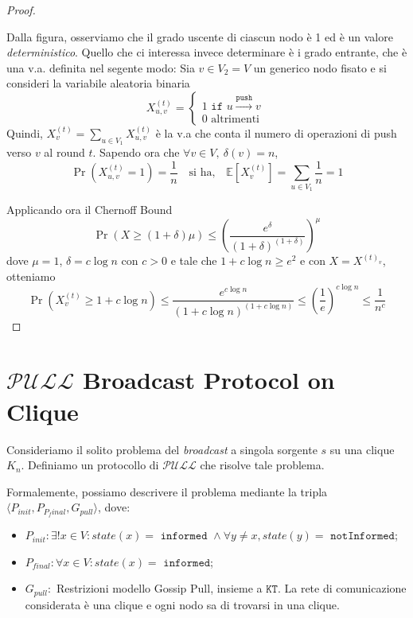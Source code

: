 \begin{lemma}
\begin{proof}
\begin{center}
\begin{tikzpicture}
            \end{tikzpicture}
        \end{center}
        Dalla figura, osserviamo che il grado uscente di ciascun nodo è 1 ed è un valore \textit{deterministico}. Quello che ci interessa invece determinare è i grado entrante, che è una v.a. definita nel segente modo: Sia $v \in V_2 = V$ un generico nodo fisato e si consideri la variabile aleatoria binaria
        \[
        X^{(t)}_{u,v} = 
            \begin{cases*}
            1 \texttt{ if } u \xrightarrow{\texttt{push}} v \\
            0 \text{ altrimenti }
            \end{cases*}
        \]
        Quindi, $X^{(t)}_v = \sum_{u \in V_1} X^{(t)}_{u,v}$ è la v.a che conta il numero di operazioni di push verso $v$ al round $t$. Sapendo ora che $\forall v \in V,\ \delta(v) = n$, 
        \[
            \Pr \left( X^{(t)}_{u,v} = 1 \right) = \frac{1}{n} \quad \text{si ha,} \quad
            \mathbb{E}\left[ X^{(t)}_v \right] = \sum_{u \in V_1} \frac{1}{n} = 1
        \]
        
        Applicando ora il Chernoff Bound 
        \[
            \Pr\left( X \geq (1 + \delta)\mu \right) \leq \left( \frac{e^\delta}{(1+\delta)^{(1 + \delta)}} \right)^\mu
        \]
        dove $\mu = 1$, $\delta = c \log n$ con $c > 0$ e tale che $1 + c\log n \geq e^2$ e con $X = X^{(t)_v}$, otteniamo
        \[
            \Pr\left( X^{(t)}_v \geq 1 + c\log n \right) \leq \frac{e^{c\log n}}{(1+ c\log n)^{(1 + c \log n)}} \leq \left(\frac{1}{e}\right)^{c\log n} \leq \frac{1}{n^c}
        \]
    \end{proof}
\end{lemma}

\section{$\mathcal{PULL}$ Broadcast Protocol on Clique}

Consideriamo il solito problema del \textit{broadcast} a singola sorgente $s$ su una clique $K_n$. Definiamo un protocollo di $\mathcal{PULL}$ che risolve tale problema.

Formalemente, possiamo descrivere il problema mediante la tripla $\langle P_{init}, P_{P_final}, G_{pull} \rangle$, dove:
\begin{itemize}
    \item $P_{init}: \exists! x \in V: state(x) = \texttt{ informed } \land \forall y \neq x, state (y) = \texttt{ notInformed}$;
    \item $P_{final}: \forall x \in V: state(x) = \texttt{ informed}$;
    \item $G_{pull}:$ Restrizioni modello Gossip Pull, insieme a $\texttt{KT}$. La rete di comunicazione considerata è una clique e ogni nodo sa di trovarsi in una clique. 
\end{itemize}


